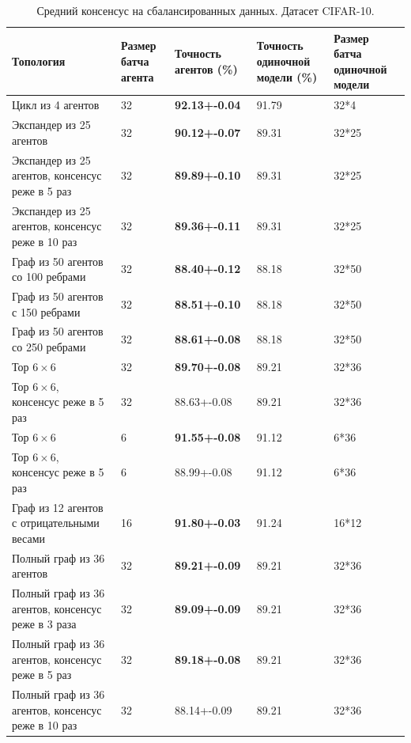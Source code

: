 \documentclass[a4paper,article,14pt]{extarticle}
\begin{document}
\begin{center}
    \begin{longtable}{|p{5cm}|p{2cm}|p{3cm}|p{3cm}|p{2cm}|}
    \caption{Средний консенсус на сбалансированных данных. Датасет CIFAR-10.}
    \label{table:tab1}\\
    \hline
    \textbf{Топология} & \textbf{Размер батча агента} & \textbf{Точность агентов (\%)} & \textbf{Точность одиночной модели (\%)} & \textbf{Размер батча одиночной модели}\\
    \hline
    Цикл из 4 агентов & 32 & \textbf{92.13+-0.04} & 91.79 & 32*4\\
    \hline
    Экспандер из 25 агентов & 32 & \textbf{90.12+-0.07} & 89.31 & 32*25\\
    \hline
    Экспандер из 25 агентов, консенсус реже в 5 раз& 32 & \textbf{89.89+-0.10} & 89.31 & 32*25\\
    \hline
    Экспандер из 25 агентов, консенсус реже в 10 раз& 32 & \textbf{89.36+-0.11} & 89.31 & 32*25\\
    \hline
    Граф из 50 агентов со 100 ребрами& 32 & \textbf{88.40+-0.12} & 88.18 & 32*50\\
    \hline
    Граф из 50 агентов с 150 ребрами& 32 & \textbf{88.51+-0.10} & 88.18 & 32*50\\
    \hline
    Граф из 50 агентов со 250 ребрами& 32 & \textbf{88.61+-0.08} & 88.18 & 32*50\\
    \hline
    Тор $6\times 6$ & 32 & \textbf{89.70+-0.08} & 89.21 & 32*36\\
    \hline
    Тор $6\times 6$, консенсус реже в 5 раз& 32 & 88.63+-0.08 & 89.21 & 32*36\\
    \hline
    Тор $6\times 6$ & 6 & \textbf{91.55+-0.08} & 91.12 & 6*36\\
    \hline
    Тор $6\times 6$, консенсус реже в 5 раз& 6 & 88.99+-0.08 & 91.12 & 6*36\\
    \hline
    Граф из 12 агентов с отрицательными весами& 16 & \textbf{91.80+-0.03} & 91.24 & 16*12\\
    \hline
    Полный граф из 36 агентов& 32 & \textbf{89.21+-0.09} & 89.21& 32*36\\
    \hline
    Полный граф из 36 агентов, консенсус реже в 3 раза& 32 & \textbf{89.09+-0.09}& 89.21& 32*36\\
    \hline
    Полный граф из 36 агентов, консенсус реже в 5 раз& 32 & \textbf{89.18+-0.08}& 89.21& 32*36\\
    \hline
    Полный граф из 36 агентов, консенсус реже в 10 раз& 32 & 88.14+-0.09& 89.21& 32*36\\
    \hline
    \end{longtable}
\end{center}
\end{document}
